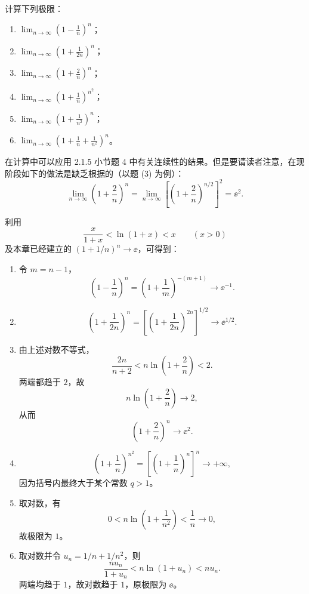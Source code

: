 \begin{xexercise}[1]
计算下列极限：
  \begin{enumerate}[label=(\arabic*)]
    \item $\displaystyle\lim_{n\to\infty}\left(1-\frac1n\right)^n$；
    \item $\displaystyle\lim_{n\to\infty}\left(1+\frac1{2n}\right)^n$；
    \item $\displaystyle\lim_{n\to\infty}\left(1+\frac2n\right)^n$；
    \item $\displaystyle\lim_{n\to\infty}\left(1+\frac1n\right)^{n^2}$；
    \item $\displaystyle\lim_{n\to\infty}\left(1+\frac1{n^2}\right)^n$；
    \item $\displaystyle\lim_{n\to\infty}\left(1+\frac1n+\frac1{n^2}\right)^n$。
  \end{enumerate}

  \begin{xremark}
  在计算中可以应用 2.1.5 小节题 4 中有关连续性的结果。但是要请读者注意，在现阶段如下的做法是缺乏根据的（以题 (3) 为例）：
  \[
    \lim_{n\to\infty}\left(1+\frac2n\right)^n
    =\lim_{n\to\infty}\left[\left(1+\frac2n\right)^{n/2}\right]^2
    =\ee^2.
  \]
  \end{xremark}
\end{xexercise}
\begin{xsolution}
利用
\[
  \frac{x}{1+x}<\ln(1+x)<x\qquad(x>0)
\]
及本章已经建立的 $\left(1+1/n\right)^n\to\ee$，可得到：
\begin{enumerate}[label=(\arabic*)]
  \item 令 $m=n-1$，
  \[
    \left(1-\frac1n\right)^n
    =\left(1+\frac1m\right)^{-(m+1)}\to\ee^{-1}.
  \]
  \item
  \[
    \left(1+\frac1{2n}\right)^n
    =\left[\left(1+\frac1{2n}\right)^{2n}\right]^{1/2}\to\ee^{1/2}.
  \]
  \item 由上述对数不等式，
  \[
    \frac{2n}{n+2}
    <n\ln\left(1+\frac2n\right)<2.
  \]
  两端都趋于 $2$，故
  \[
    n\ln\left(1+\frac2n\right)\to2,
  \]
  从而
  \[
    \left(1+\frac2n\right)^n\to\ee^2.
  \]
  \item
  \[
    \left(1+\frac1n\right)^{n^2}
    =\left[\left(1+\frac1n\right)^n\right]^n\to+\infty,
  \]
  因为括号内最终大于某个常数 $q>1$。
  \item 取对数，有
  \[
    0<n\ln\left(1+\frac1{n^2}\right)<\frac1n\to0,
  \]
  故极限为 $1$。
  \item 取对数并令 $u_n=1/n+1/n^2$，则
  \[
    \frac{nu_n}{1+u_n}<n\ln(1+u_n)<nu_n.
  \]
  两端均趋于 $1$，故对数趋于 $1$，原极限为 $\ee$。
\end{enumerate}
\end{xsolution}



